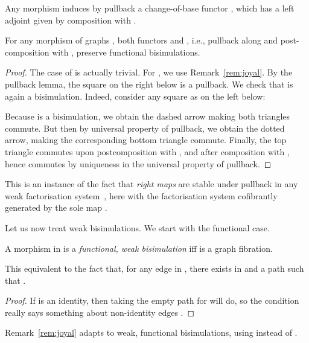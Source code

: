\documentclass{LMCS}
\theoremstyle{plain}\newtheorem{satz}[thm]{Satz}
\begin{document}
Any morphism  induces by pullback a change-of-base
functor , which has a left
adjoint  given by composition with .

\begin{prop}\label{prop:change of base}
  For any morphism of graphs , both functors  and , i.e., pullback along and post-composition with ,
  preserve functional bisimulations.
\end{prop}

\begin{proof}
  The case of  is actually trivial.
  For , we use Remark~\ref{rem:joyal}. By the pullback lemma,
  the square on the right below
is a pullback. We check that  is again a
  bisimulation. Indeed, consider any square as
  on the left below:
\begin{center}
  \end{center}
  Because  is a bisimulation, we obtain the dashed arrow
  making both triangles commute. But then by universal property of
  pullback, we obtain the dotted arrow, making the corresponding
  bottom triangle commute.  Finally, the top triangle commutes upon
  postcomposition with , and after composition with
  , hence commutes by uniqueness in the
  universal property of pullback.
\end{proof}
\begin{rem}
  This is an instance of the fact that \emph{right maps} are stable
  under pullback in any weak factorisation
  system~\cite{Joyal:ncatlab:facto}, here with the factorisation
  system cofibrantly generated by the sole map .
\end{rem}

Let us now treat weak bisimulations. We start with the functional case.
\begin{defi}
  A morphism  in  is a \emph{functional,
    weak bisimulation} iff  is a graph fibration.
\end{defi}
\begin{prop}
  This equivalent to the fact that, for any edge  in , there exists  in  and a path  such that .
\end{prop}
\begin{proof}
  If  is an identity, then taking the empty path for  will do,
  so the condition really says something about non-identity edges .
\end{proof}
\begin{rem}
  Remark~\ref{rem:joyal} adapts to weak, functional bisimulations,
  using  instead of .
\end{rem}
\end{document}

